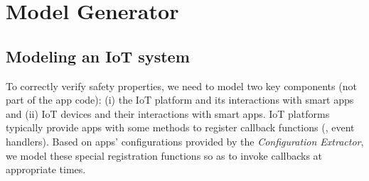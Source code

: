 \chapter{Model Generator}
\label{sec:model}

\section{Modeling an IoT system}
To correctly verify safety properties, we need to model two key components (not part of the app code):
(i) the IoT platform and its interactions with smart apps and
(ii) IoT devices and their interactions with smart apps.
{\color{black}IoT platforms~\cite{iftttpage,Samsung:smartthings,Apple:homekit,Amazon:alexa,Microsoft:iot} typically provide apps with some methods to register callback functions (\ie, event handlers).
Based on apps' configurations provided by the \textit{Configuration Extractor}, we model these special registration functions so as to invoke callbacks at appropriate times.}

